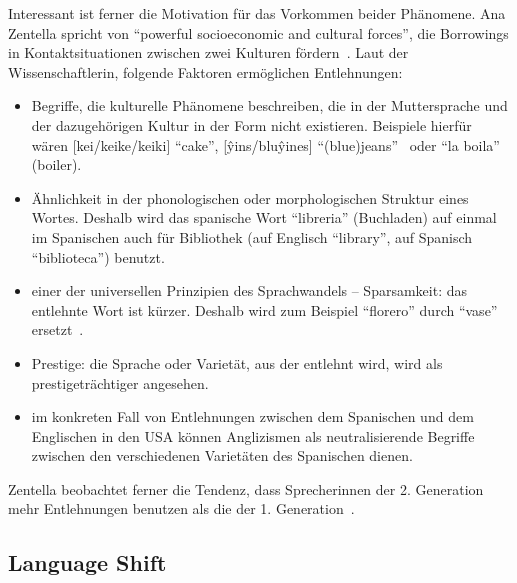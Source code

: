 Interessant ist ferner die Motivation für das Vorkommen beider Phänomene.
Ana Zentella spricht von ``powerful socioeconomic and cultural forces'', die Borrowings in Kontaktsituationen zwischen zwei Kulturen fördern~\cite{Zentella90}. %
Laut der Wissenschaftlerin, folgende Faktoren ermöglichen Entlehnungen:
\begin{itemize}
  \item Begriffe, die kulturelle Phänomene beschreiben, die in der Muttersprache und der dazugehörigen Kultur in der Form nicht existieren. Beispiele hierfür wären [kei/keike/keiki] ``cake'', [\^yins/blu\^yines] ``(blue)jeans''~\cite{Zentella90} oder ``la boila'' (boiler). %
  \item Ähnlichkeit in der phonologischen oder morphologischen Struktur eines Wortes.
    Deshalb wird das spanische Wort ``libreria'' (Buchladen) auf einmal im Spanischen auch für Bibliothek (auf Englisch ``library'', auf Spanisch ``biblioteca'') benutzt. %
  \item einer der universellen Prinzipien des Sprachwandels -- Sparsamkeit: das entlehnte Wort ist kürzer. Deshalb wird zum Beispiel ``florero'' durch ``vase'' ersetzt~\cite{Zentella90}.%
  \item Prestige: die Sprache oder Varietät, aus der entlehnt wird, wird als prestigeträchtiger angesehen.
  \item im konkreten Fall von Entlehnungen zwischen dem Spanischen und dem Englischen in den USA können Anglizismen als neutralisierende Begriffe zwischen den verschiedenen Varietäten des Spanischen dienen.
\end{itemize}

Zentella beobachtet ferner die Tendenz, dass Sprecherinnen der 2. Generation mehr Entlehnungen benutzen als die der 1. Generation~\cite{Zentella90}.%


\subsection{Language Shift}

